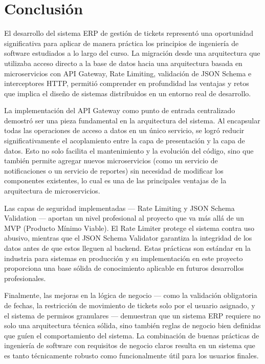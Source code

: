 \documentclass[12pt,a4paper]{article}
\begin{document}
\section{Conclusión}

El desarrollo del sistema ERP de gestión de tickets representó una oportunidad significativa para aplicar de manera práctica los principios de ingeniería de software estudiados a lo largo del curso. La migración desde una arquitectura que utilizaba acceso directo a la base de datos hacia una arquitectura basada en microservicios con API Gateway, Rate Limiting, validación de JSON Schema e interceptores HTTP, permitió comprender en profundidad las ventajas y retos que implica el diseño de sistemas distribuidos en un entorno real de desarrollo.

La implementación del API Gateway como punto de entrada centralizado demostró ser una pieza fundamental en la arquitectura del sistema. Al encapsular todas las operaciones de acceso a datos en un único servicio, se logró reducir significativamente el acoplamiento entre la capa de presentación y la capa de datos. Esto no solo facilita el mantenimiento y la evolución del código, sino que también permite agregar nuevos microservicios (como un servicio de notificaciones o un servicio de reportes) sin necesidad de modificar los componentes existentes, lo cual es una de las principales ventajas de la arquitectura de microservicios.

Las capas de seguridad implementadas --- Rate Limiting y JSON Schema Validation --- aportan un nivel profesional al proyecto que va más allá de un MVP (Producto Mínimo Viable). El Rate Limiter protege el sistema contra uso abusivo, mientras que el JSON Schema Validator garantiza la integridad de los datos antes de que estos lleguen al backend. Estas prácticas son estándar en la industria para sistemas en producción y su implementación en este proyecto proporciona una base sólida de conocimiento aplicable en futuros desarrollos profesionales.

Finalmente, las mejoras en la lógica de negocio --- como la validación obligatoria de fechas, la restricción de movimiento de tickets solo por el usuario asignado, y el sistema de permisos granulares --- demuestran que un sistema ERP requiere no solo una arquitectura técnica sólida, sino también reglas de negocio bien definidas que guíen el comportamiento del sistema. La combinación de buenas prácticas de ingeniería de software con requisitos de negocio claros resulta en un sistema que es tanto técnicamente robusto como funcionalmente útil para los usuarios finales.
\end{document}
